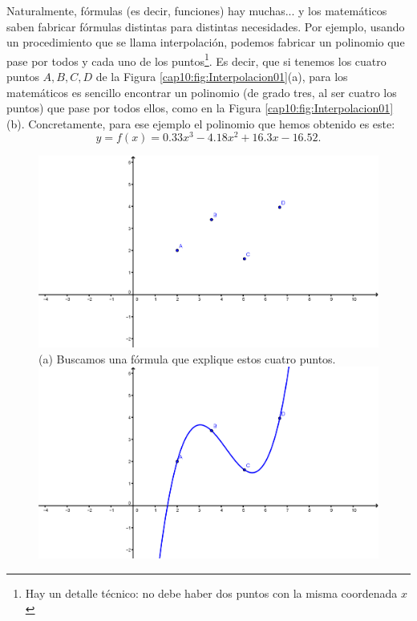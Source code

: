 Naturalmente, fórmulas (es decir, funciones) hay muchas... y los matemáticos saben fabricar fórmulas distintas para distintas necesidades. Por ejemplo, usando un procedimiento que se llama {\sf interpolación}, podemos fabricar un polinomio que pase por todos y cada uno de los puntos\footnote{Hay un detalle técnico: no debe haber dos puntos con la misma coordenada $x$}. Es decir, que si tenemos los cuatro puntos $A, B, C, D$ de la Figura \ref{cap10:fig:Interpolacion01}(a), para los matemáticos es sencillo encontrar un polinomio (de grado tres, al ser cuatro los puntos) que pase por todos ellos, como en la Figura \ref{cap10:fig:Interpolacion01}(b). Concretamente, para ese ejemplo el polinomio que hemos obtenido es este:
\[y=f(x)=0.33x^3-4.18x^2+16.3x-16.52.\]

\begin{figure}[htbp]
\begin{center}
\begin{enColor}
\includegraphics[width=12cm]{../fig/Cap10-Interpolacion01.png}\\
(a) Buscamos una f\'ormula que explique estos cuatro puntos.\\[3mm]
\includegraphics[width=12cm]{../fig/Cap10-Interpolacion02.png}\\

\end{enColor}
\end{center}
\end{figure}
